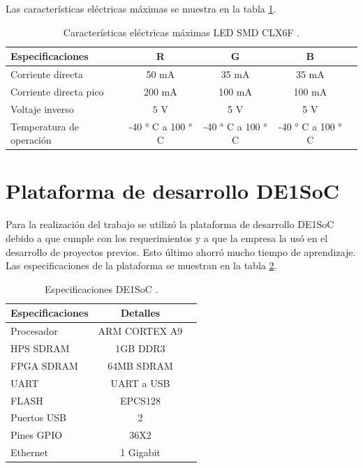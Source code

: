 Las características eléctricas máximas se muestra en la tabla \ref{tab:MAXLEDCLX6F}.


\begin{table}[h]
\centering
\caption[Características eléctricas máximas LED CLX6F]{Características eléctricas máximas LED SMD CLX6F \protect\footnotemark.}
\begin{tabular}{l c c c c}
\toprule
\textbf{Especificaciones}& \textbf{R} & \textbf{G} & \textbf{B}\\
\midrule 


Corriente directa &50 mA &35 mA &35 mA\\
Corriente directa pico &200 mA &100 mA &100 mA \\
Voltaje inverso &5 V &5 V &5 V\\
Temperatura de operación &-40 \si{\degree} C a 100 \si{\degree} C  &-40 \si{\degree} C a 100 \si{\degree} C  &-40 \si{\degree} C a 100 \si{\degree} C\\


\bottomrule
\hline
\end{tabular}
\label{tab:MAXLEDCLX6F}
\end{table}




\section{ Plataforma de desarrollo DE1SoC}
Para la realización del trabajo se utilizó la plataforma de desarrollo DE1SoC debido a que cumple con los requerimientos y a que la empresa la usó en el desarrollo de proyectos previos. Esto último ahorró mucho tiempo de aprendizaje. Las especificaciones de la plataforma se muestran en la tabla \ref{tab:DE1SOCTABLA}.

\begin{table}[h]
\centering
\caption[Especificaciones DE1SoC]{Especificaciones DE1SoC \protect\footnotemark.}
\begin{tabular}{l c c}
\toprule
\textbf{Especificaciones}& \textbf{Detalles}\\
\midrule 


Procesador & ARM CORTEX A9\\
HPS SDRAM & 1GB DDR3\\
FPGA SDRAM & 64MB SDRAM\\
UART & UART a USB\\
FLASH & EPCS128\\
Puertos USB & 2\\
Pines GPIO & 36X2\\
Ethernet & 1 Gigabit\\


\bottomrule
\hline
\end{tabular}
\label{tab:DE1SOCTABLA}
\end{table}

